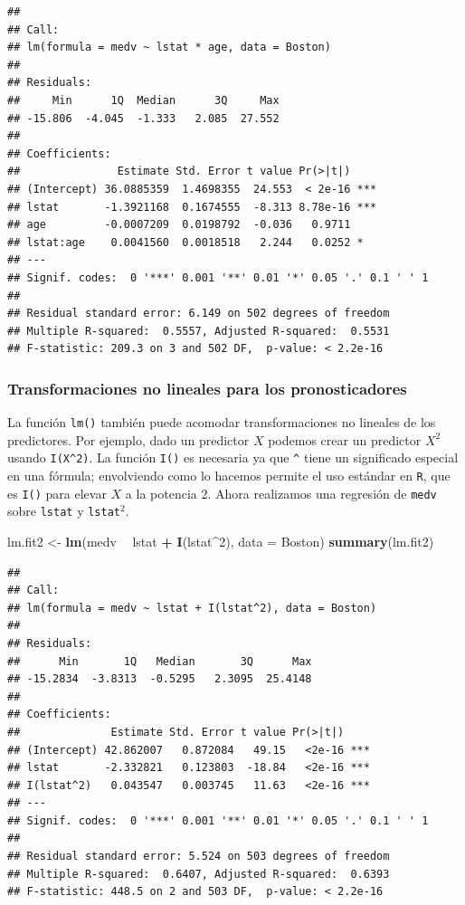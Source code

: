 \documentclass[]{book}
\newenvironment{Shaded}{\begin{snugshade}}{\end{snugshade}}
\newcommand{\KeywordTok}[1]{\textcolor[rgb]{0.13,0.29,0.53}{\textbf{#1}}}
\newcommand{\DataTypeTok}[1]{\textcolor[rgb]{0.13,0.29,0.53}{#1}}
\newcommand{\DecValTok}[1]{\textcolor[rgb]{0.00,0.00,0.81}{#1}}
\newcommand{\StringTok}[1]{\textcolor[rgb]{0.31,0.60,0.02}{#1}}
\newcommand{\OperatorTok}[1]{\textcolor[rgb]{0.81,0.36,0.00}{\textbf{#1}}}
\newcommand{\NormalTok}[1]{#1}
\begin{document}
\begin{verbatim}
## 
## Call:
## lm(formula = medv ~ lstat * age, data = Boston)
## 
## Residuals:
##     Min      1Q  Median      3Q     Max 
## -15.806  -4.045  -1.333   2.085  27.552 
## 
## Coefficients:
##               Estimate Std. Error t value Pr(>|t|)    
## (Intercept) 36.0885359  1.4698355  24.553  < 2e-16 ***
## lstat       -1.3921168  0.1674555  -8.313 8.78e-16 ***
## age         -0.0007209  0.0198792  -0.036   0.9711    
## lstat:age    0.0041560  0.0018518   2.244   0.0252 *  
## ---
## Signif. codes:  0 '***' 0.001 '**' 0.01 '*' 0.05 '.' 0.1 ' ' 1
## 
## Residual standard error: 6.149 on 502 degrees of freedom
## Multiple R-squared:  0.5557, Adjusted R-squared:  0.5531 
## F-statistic: 209.3 on 3 and 502 DF,  p-value: < 2.2e-16
\end{verbatim}

\subsubsection{Transformaciones no lineales para los
pronosticadores}\label{transformaciones-no-lineales-para-los-pronosticadores}

La función \texttt{lm()} también puede acomodar transformaciones no
lineales de los predictores. Por ejemplo, dado un predictor \(X\)
podemos crear un predictor \(X^2\) usando \texttt{I(X\^{}2)}. La función
\texttt{I()} es necesaria ya que \texttt{\^{}} tiene un significado
especial en una fórmula; envolviendo como lo hacemos permite el uso
estándar en \texttt{R}, que es \texttt{I()} para elevar \(X\) a la
potencia 2. Ahora realizamos una regresión de \texttt{medv} sobre
\texttt{lstat} y \texttt{lstat}\(^2\).

\begin{Shaded}
\begin{Highlighting}[]
\NormalTok{lm.fit2 <-}\StringTok{ }\KeywordTok{lm}\NormalTok{(medv }\OperatorTok{~}\StringTok{ }\NormalTok{lstat }\OperatorTok{+}\StringTok{ }\KeywordTok{I}\NormalTok{(lstat}\OperatorTok{^}\DecValTok{2}\NormalTok{), }\DataTypeTok{data =}\NormalTok{ Boston)}
\KeywordTok{summary}\NormalTok{(lm.fit2)}
\end{Highlighting}
\end{Shaded}

\begin{verbatim}
## 
## Call:
## lm(formula = medv ~ lstat + I(lstat^2), data = Boston)
## 
## Residuals:
##      Min       1Q   Median       3Q      Max 
## -15.2834  -3.8313  -0.5295   2.3095  25.4148 
## 
## Coefficients:
##              Estimate Std. Error t value Pr(>|t|)    
## (Intercept) 42.862007   0.872084   49.15   <2e-16 ***
## lstat       -2.332821   0.123803  -18.84   <2e-16 ***
## I(lstat^2)   0.043547   0.003745   11.63   <2e-16 ***
## ---
## Signif. codes:  0 '***' 0.001 '**' 0.01 '*' 0.05 '.' 0.1 ' ' 1
## 
## Residual standard error: 5.524 on 503 degrees of freedom
## Multiple R-squared:  0.6407, Adjusted R-squared:  0.6393 
## F-statistic: 448.5 on 2 and 503 DF,  p-value: < 2.2e-16
\end{verbatim}
\end{document}
